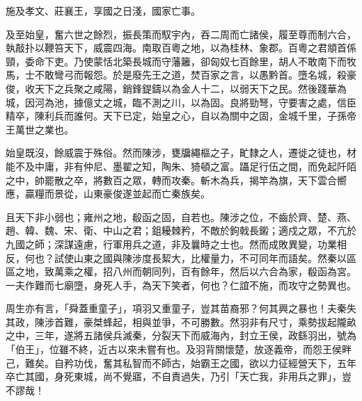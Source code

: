 \begin{pinyinscope}
施及孝文、莊襄王，享國之日淺，國家亡事。

及至始皇，奮六世之餘烈，振長策而馭宇內，吞二周而亡諸侯，履至尊而制六合，執敲扑以鞭笞天下，威震四海。南取百粵之地，以為桂林、象郡。百粵之君頫首係頸，委命下吏。乃使蒙恬北築長城而守藩籬，卻匈奴七百餘里，胡人不敢南下而牧馬，士不敢彎弓而報怨。於是廢先王之道，焚百家之言，以愚黔首。墮名城，殺豪俊，收天下之兵聚之咸陽，銷鋒鍉鑄以為金人十二，以弱天下之民。然後踐華為城，因河為池，據億丈之城，臨不測之川，以為固。良將勁弩，守要害之處，信臣精卒，陳利兵而誰何。天下已定，始皇之心，自以為關中之固，金城千里，子孫帝王萬世之業也。

始皇既沒，餘威震于殊俗。然而陳涉，甕牖繩樞之子，甿隸之人，遷徙之徒也，材能不及中庸，非有仲尼、墨翟之知，陶朱、猗頓之富。躡足行伍之間，而免起阡陌之中，帥罷散之卒，將數百之眾，轉而攻秦。斬木為兵，揭竿為旗，天下雲合嚮應，贏糧而景從，山東豪俊遂並起而亡秦族矣。

且天下非小弱也；雍州之地，殽函之固，自若也。陳涉之位，不齒於齊、楚、燕、趙、韓、魏、宋、衛、中山之君；鉏耰棘矜，不敵於鉤戟長鎩；適戍之眾，不亢於九國之師；深謀遠慮，行軍用兵之道，非及曩時之士也。然而成敗異變，功業相反，何也？試使山東之國與陳涉度長絜大，比權量力，不可同年而語矣。然秦以區區之地，致萬乘之權，招八州而朝同列，百有餘年，然后以六合為家，殽函為宮。一夫作難而七廟墮，身死人手，為天下笑者，何也？仁誼不施，而攻守之勢異也。

周生亦有言，「舜蓋重童子」，項羽又重童子，豈其苗裔邪？何其興之暴也！夫秦失其政，陳涉首難，豪桀蜂起，相與並爭，不可勝數。然羽非有尺寸，乘勢拔起隴畝之中，三年，遂將五諸侯兵滅秦，分裂天下而威海內，封立王侯，政繇羽出，號為「伯王」，位雖不終，近古以來未嘗有也。及羽背關懷楚，放逐義帝，而怨王侯畔己，難矣。自矜功伐，奮其私智而不師古，始霸王之國，欲以力征經營天下，五年卒亡其國，身死東城，尚不覺寤，不自責過失，乃引「天亡我，非用兵之罪」，豈不謬哉！


\end{pinyinscope}